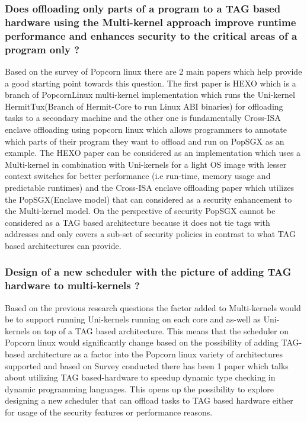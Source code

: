 \subsubsection{Does offloading only parts of a program to a TAG based hardware using the Multi-kernel approach improve runtime performance 
and enhances security to the critical areas of a program only ?}
Based on the survey of Popcorn linux there are 2 main papers which help provide a good starting point towards this question. The first 
paper is HEXO \cite{HEXO} which is a branch of PopcornLinux multi-kernel implementation which runs the Uni-kernel HermitTux(Branch of 
Hermit-Core to run Linux ABI binaries) for offloading tasks to a secondary machine and the other one is fundamentally Cross-ISA enclave offloading using
popcorn linux \cite{PopcornEnclave} which allows programmers to annotate which parts of their program they want to offload and run on
PopSGX as an example. The HEXO paper can be considered as an implementation which uses a Multi-kernel in combination with Uni-kernels
for a light OS image with lesser context switches for better performance (i.e run-time, memory usage and predictable runtimes)
and the Cross-ISA enclave offloading paper which utilizes the PopSGX(Enclave model\cite{Enclave}) that can considered as 
a security enhancement to the Multi-kernel model. On the perspective of security PopSGX cannot be considered as 
a TAG based architecture because it does not tie tags with addresses and only covers a sub-set of security policies in contrast
to what TAG based architectures can provide.

\subsubsection{Design of a new scheduler with the picture of adding TAG hardware to multi-kernels ?}
Based on the previous research questions the factor added to Multi-kernels would be to support running Uni-kernels running on 
each core and as-well as Uni-kernels on top of a TAG based architecture. This means that the scheduler on 
Popcorn linux would significantly change based on the possibility of adding TAG-based architecture as a factor into the 
Popcorn linux variety of architectures supported and based on Survey conducted there has been 1 paper\cite{TypedArchitecture} 
which talks about utilizing TAG based-hardware to speedup dynamic type checking in dynamic programming languages. This opens up the possibility to explore designing a 
new scheduler that can offload tasks to TAG based hardware either for usage of the security features or performance reasons. 